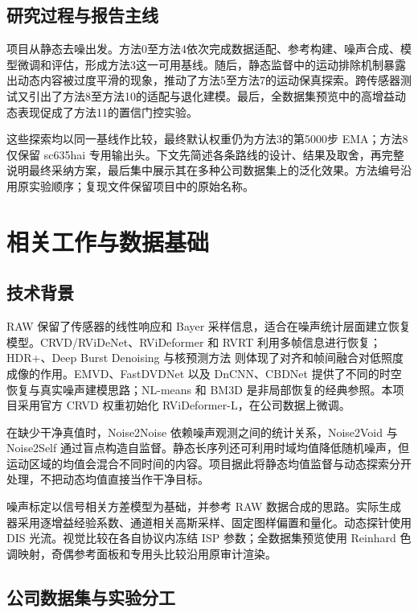 \documentclass[11pt,a4paper,UTF8,fontset=fandol]{ctexart}
\begin{document}
\subsection{研究过程与报告主线}

项目从静态去噪出发。方法0至方法4依次完成数据适配、参考构建、噪声合成、模型微调和评估，形成方法3这一可用基线。随后，静态监督中的运动排除机制暴露出动态内容被过度平滑的现象，推动了方法5至方法7的运动保真探索。跨传感器测试又引出了方法8至方法10的适配与退化建模。最后，全数据集预览中的高增益动态表现促成了方法11的置信门控实验。

这些探索均以同一基线作比较，最终默认权重仍为方法3的第5000步 EMA；方法8仅保留 sc635hai 专用输出头。下文先简述各条路线的设计、结果及取舍，再完整说明最终采纳方案，最后集中展示其在多种公司数据集上的泛化效果。方法编号沿用原实验顺序；复现文件保留项目中的原始名称。

\section{相关工作与数据基础}

\subsection{技术背景}

RAW 保留了传感器的线性响应和 Bayer 采样信息，适合在噪声统计层面建立恢复模型。CRVD/RViDeNet\cite{r1}、RViDeformer\cite{r2} 和 RVRT\cite{r3} 利用多帧信息进行恢复；HDR+\cite{r10}、Deep Burst Denoising\cite{r9} 与核预测方法\cite{r17} 则体现了对齐和帧间融合对低照度成像的作用。EMVD\cite{r15}、FastDVDNet\cite{r16} 以及 DnCNN\cite{r14}、CBDNet\cite{r20} 提供了不同的时空恢复与真实噪声建模思路；NL-means\cite{r18} 和 BM3D\cite{r19} 是非局部恢复的经典参照。本项目采用官方 CRVD 权重初始化 RViDeformer-L，在公司数据上微调。

在缺少干净真值时，Noise2Noise\cite{r4} 依赖噪声观测之间的统计关系，Noise2Void\cite{r5} 与 Noise2Self\cite{r6} 通过盲点构造自监督。静态长序列还可利用时域均值降低随机噪声，但运动区域的均值会混合不同时间的内容。项目据此将静态均值监督与动态探索分开处理，不把动态均值直接当作干净目标。

噪声标定以信号相关方差模型\cite{r7}为基础，并参考 RAW 数据合成的思路\cite{r8}。实际生成器采用逐增益经验系数、通道相关高斯采样、固定图样偏置和量化。动态探针使用 DIS 光流\cite{r11}。视觉比较在各自协议内冻结 ISP 参数；全数据集预览使用 Reinhard 色调映射\cite{r12}，奇偶参考面板和专用头比较沿用原审计渲染。

\subsection{公司数据集与实验分工}
\end{document}
